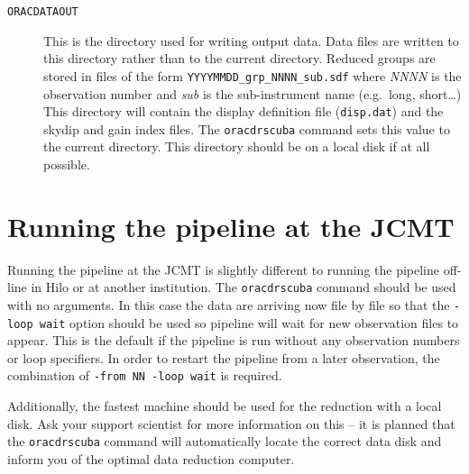 \documentclass[twoside,11pt]{article}
\newcommand{\xlabel}[1]{}
\renewcommand{\_}{\texttt{\symbol{95}}}
\begin{document}
\begin{description}
\item[\texttt{ORAC\_DATA\_OUT}] \mbox{}

This is the directory used for writing output data. Data files are
written to this directory rather than to the current directory.
Reduced groups are stored in files of the form
\verb|YYYYMMDD_grp_NNNN_sub.sdf| where \textit{NNNN} is the observation
number and \textit{sub} is the sub-instrument name (e.g.\ long, short\ldots)
This directory will contain the display definition file (\verb|disp.dat|)
and the skydip and gain index files. The \texttt{oracdr\_scuba}
command sets this value to the current directory. This directory
should be on a local disk if at all possible.

\end{description}


\section{Running the pipeline at the JCMT\xlabel{running_the_pipeline_at_the_jcmt}}

Running the pipeline at the JCMT is slightly different to running the pipeline
off-line in Hilo or at another institution.  The \texttt{oracdr\_scuba} command
should be used with no arguments.  In this case the data are arriving now file
by file so that the \texttt{-loop wait} option should be used so pipeline will
wait for new observation files to appear. This is the default if the pipeline
is run without any observation numbers or loop specifiers.  In order to
restart the pipeline from a later observation, the combination of
\texttt{-from NN -loop wait} is required.

Additionally, the fastest machine should be used for the reduction
with a local disk. Ask your support scientist for more information
on this -- it is planned that the \texttt{oracdr\_scuba} command
will automatically locate the correct data disk and inform you
of the optimal data reduction computer.



\end{document}
